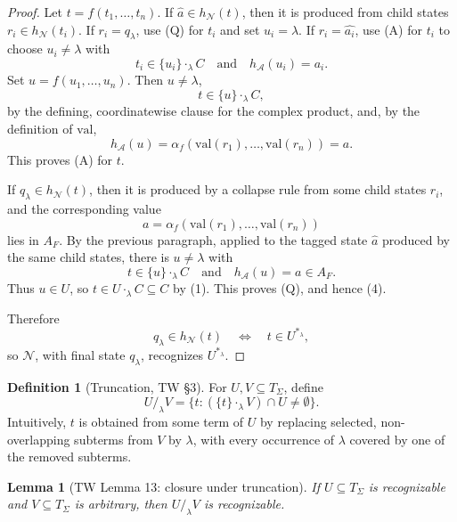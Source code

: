 \documentclass[11pt]{article}
\newtheorem{lemma}[theorem]{Lemma}
\theoremstyle{definition}
\newtheorem{definition}[theorem]{Definition}
\newcommand{\SigmaSym}{\Sigma}
\newcommand{\Term}[1]{T_{#1}}
\newcommand{\Aut}{\mathcal A}
\begin{document}
\begin{proof}
Let \(t=f(t_1,\ldots,t_n)\).  If \(\widehat a\in h_{\mathcal N}(t)\), then it is
produced from child states \(r_i\in h_{\mathcal N}(t_i)\).  If
\(r_i=q_\lambda\), use (Q) for \(t_i\) and set \(u_i=\lambda\).  If
\(r_i=\widehat{a_i}\), use (A) for \(t_i\) to choose \(u_i\ne\lambda\) with
\[
  t_i\in\{u_i\}\cdot_\lambda C
  \quad\text{and}\quad
  h_\Aut(u_i)=a_i.
\]
Set \(u=f(u_1,\ldots,u_n)\).  Then \(u\ne\lambda\),
\[
  t\in\{u\}\cdot_\lambda C,
\]
by the defining, coordinatewise clause for the complex product, and, by the
definition of \(\mathrm{val}\),
\[
  h_\Aut(u)=\alpha_f(\mathrm{val}(r_1),\ldots,\mathrm{val}(r_n))=a.
\]
This proves (A) for \(t\).

If \(q_\lambda\in h_{\mathcal N}(t)\), then it is produced by a collapse rule
from some child states \(r_i\), and the corresponding value
\[
  a=\alpha_f(\mathrm{val}(r_1),\ldots,\mathrm{val}(r_n))
\]
lies in \(A_F\).  By the previous paragraph, applied to the tagged state
\(\widehat a\) produced by the same child states, there is \(u\ne\lambda\) with
\[
  t\in\{u\}\cdot_\lambda C
  \quad\text{and}\quad
  h_\Aut(u)=a\in A_F.
\]
Thus \(u\in U\), so \(t\in U\cdot_\lambda C\subseteq C\) by (1).  This proves
(Q), and hence (4).

Therefore
\[
  q_\lambda\in h_{\mathcal N}(t)
  \quad\Longleftrightarrow\quad
  t\in U^{*_\lambda},
\]
so \(\mathcal N\), with final state \(q_\lambda\), recognizes
\(U^{*_\lambda}\).
\end{proof}

\begin{definition}[Truncation, TW \S3]
For \(U,V\subseteq\Term{\SigmaSym}\), define
\[
  U/_{\lambda}V
  =
  \{t: ( \{t\}\cdot_\lambda V )\cap U\neq\emptyset\}.
\]
Intuitively, \(t\) is obtained from some term of \(U\) by replacing selected,
non-overlapping subterms from \(V\) by \(\lambda\), with every occurrence of
\(\lambda\) covered by one of the removed subterms.
\end{definition}

\begin{lemma}[TW Lemma 13: closure under truncation]\label{lem:tw-truncation}
If \(U\subseteq\Term{\SigmaSym}\) is recognizable and
\(V\subseteq\Term{\SigmaSym}\) is arbitrary, then \(U/_{\lambda}V\) is
recognizable.
\end{lemma}
\end{document}
